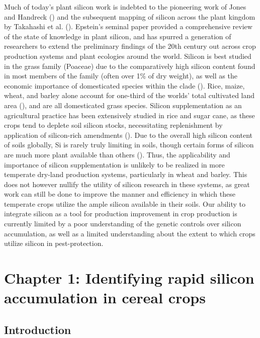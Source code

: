 \documentclass[12pt, letterpaper, ]{article}
\begin{document}
Much of today’s plant silicon work is indebted to the pioneering work of Jones and Handreck (\citeyear{jones_silica_1967}) and the subsequent mapping of silicon across the plant kingdom by Takahashi et al. (\citeyear{takahashi_possibility_1990}). Epstein’s seminal \citeyear{epstein_silicon_1999} paper provided a comprehensive review of the state of knowledge in plant silicon, and has spurred a generation of researchers to extend the preliminary findings of the 20th century out across crop production systems and plant ecologies around the world. Silicon is best studied in the grass family (Poaceae) due to the comparatively high silicon content found in most members of the family (often over 1\% of dry weight), as well as the economic importance of domesticated species within the clade (\cite{reynolds_silicon_2016}). Rice, maize, wheat, and barley alone account for one-third of the worlds’ total cultivated land area (\cite{faostat}), and are all domesticated grass species. Silicon supplementation as an agricultural practice has been extensively studied in rice and sugar cane, as these crops tend to deplete soil silicon stocks, necessitating replenishment by application of silicon-rich amendments (\cite{haynes_contemporary_2014,meena_case_2014}). Due to the overall high silicon content of soils globally, Si is rarely truly limiting in soils, though certain forms of silicon are much more plant available than others (\cite{fraysse_surface_2009}). Thus, the applicability and importance of silicon supplementation is unlikely to be realized in more temperate dry-land production systems, particularly in wheat and barley. This does not however nullify the utility of silicon research in these systems, as great work can still be done to improve the manner and efficiency in which these temperate crops utilize the ample silicon available in their soils. Our ability to integrate silicon as a tool for production improvement in crop production is currently limited by a poor understanding of the genetic controls over silicon accumulation, as well as a limited understanding about the extent to which crops utilize silicon in pest-protection. 

\section{Chapter 1: Identifying rapid silicon accumulation in cereal crops}

\subsection{Introduction}
\end{document}
